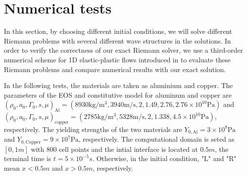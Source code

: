 \documentclass[review]{elsarticle}
\numberwithin{equation}{section}
\numberwithin{table}{section}
\begin{document}
\section{Numerical  tests }
In this section, by choosing different initial conditions, we will solve different Riemann problems with several different wave structures in the solutions. In order to verify the correctness of our exact Riemann solver, we use a third-order numerical scheme for 1D elastic-plastic flows introduced in \cite{liumulti} to evaluate these Riemann problems and compare numerical results with our exact solution.


In the following tests, the materials are taken as  aluminium and copper. The parameters of the EOS and constitutive model for aluminum and copper  are
$ (\rho_0, a_0, \Gamma_0, s, \mu)_{\text{Al}} =(8930 \text{kg}/\text{m}^3, 3940 \text{m}/\text{s},2, 1.49, 2.76 ,2.76\times 10^{10} \text{Pa} )$ and   $(\rho_0, a_0, \Gamma_0, s, \mu)_{\text{copper}} =(2785 \text{kg}/\text{m}^3, 5328 \text{m}/\text{s},2, 1.338,4.5\times 10^{10}\text{Pa})$, respectively.  The yielding strengths of the two materials are $Y_{0,\text{Al}} = 3\times 10^8 \text{Pa}$ and   $Y_{0,\text{Copper}} = 9\times 10^7 \text{Pa}$, respectively.  The computational domain is seted as $[0,1m]$ with 800 cell points and the intial interface is located at $0.5m$, the terminal time is $t=5\times 10^{-5}s$. Otherwise, in the initial condition, "L" and "R" mean $x<0.5m$ and $x>0.5m$, respectively.
\end{document}
